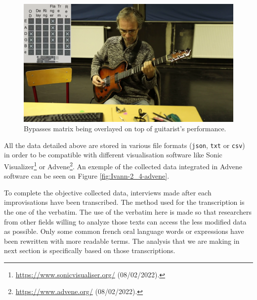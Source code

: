\documentclass{article}
\begin{document}
\begin{figure}
    \centering
    \includegraphics[width=0.9\columnwidth]{figures/Raphael-2_5-rec-impro_01-screenshot-00_05_30_800}
    \caption{Bypasses matrix being overlayed on top of guitarist's performance.}
    \label{fig:overlay}
\end{figure}

All the data detailed above are stored in various file formats (\texttt{json}, \texttt{txt} or \texttt{csv}) in order to be compatible with different visualisation software like Sonic Visualizer\footnote{\url{https://www.sonicvisualiser.org/} (08/02/2022).} or Advene\footnote{\url{https://www.advene.org/} (08/02/2022).}. An exemple of the collected data integrated in Advene software can be seen on Figure \ref{fig:Ivann-2_4-advene}. %

To complete the objective collected data, interviews made after each improvisations have been transcribed.  The me\-thod used for the transcription is the one of the verbatim. The use of the verbatim here is made so that researchers from other fields willing to analyze those texts can access the less modified data as possible. Only some common french oral language words or expressions have been rewritten with more readable terms. The analysis that we are making in next section is specifically based on those transcriptions. 



\end{document}
